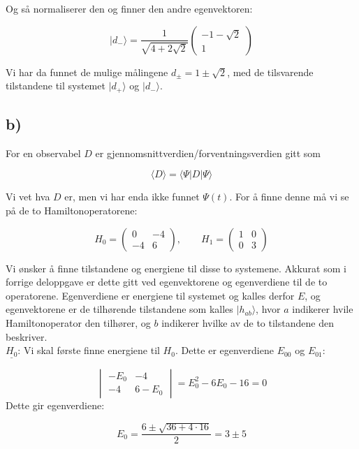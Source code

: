 \documentclass[a4paper,norsk, 10pt]{article}
\numberwithin{equation}{section}
\begin{document}
Og så normaliserer den og finner den andre egenvektoren:

\begin{equation}
|d_-\rangle = \frac{1}{\sqrt{4+2\sqrt{2}}}
\begin{pmatrix}
-1 - \sqrt{2}\\
1
\end{pmatrix}
\label{eq:d-}
\end{equation}

Vi har da funnet de mulige målingene $d_{\pm} = 1 \pm \sqrt{2}$, med de tilsvarende tilstandene til systemet $|d_+\rangle$ og $|d_-\rangle$.

\subsection*{b)}

For en observabel $D$ er gjennomsnittverdien/forventningsverdien gitt som

$$
\langle D\rangle = \langle\Psi | D | \Psi \rangle
$$

Vi vet hva $D$ er, men vi har enda ikke funnet $\Psi(t)$. For å finne denne må vi se på de to Hamiltonoperatorene:

$$
H_0 = 
\begin{pmatrix}
0 & -4\\
-4 & 6
\end{pmatrix}
, \qquad
H_1 = 
\begin{pmatrix}
1 & 0\\
0 & 3
\end{pmatrix}
$$

Vi ønsker å finne tilstandene og energiene til disse to systemene. Akkurat som i forrige deloppgave er dette gitt ved egenvektorene og egenverdiene til de to operatorene. Egenverdiene er energiene til systemet og kalles derfor $E$, og egenvektorene er de tilhørende tilstandene som kalles $|h_{ab}\rangle$, hvor $a$ indikerer hvile Hamiltonoperator den tilhører, og $b$ indikerer hvilke av de to tilstandene den beskriver.\\

\textbf{$\underline{H_0}$}: Vi skal første finne energiene til $H_0$. Dette er egenverdiene $E_{00}$ og $E_{01}$:

$$
\begin{vmatrix}
-E_0 & -4\\
-4 & 6-E_0
\end{vmatrix}
= E_0^2 -6E_0 - 16 = 0
$$
Dette gir egenverdiene:

$$
E_0 = \frac{6 \pm \sqrt{36 + 4\cdot 16}}{2} = 3\pm 5
$$
\end{document}
